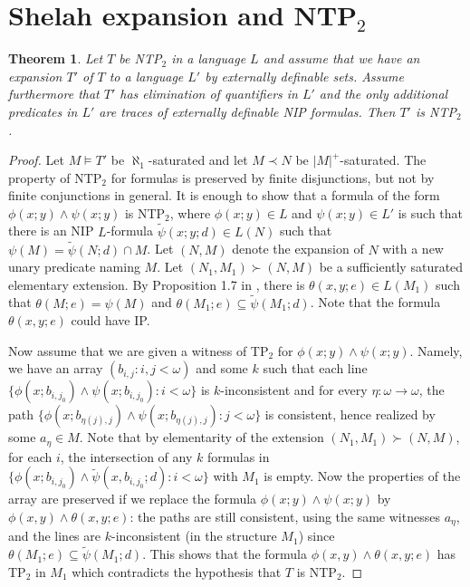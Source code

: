 \documentclass[12pt]{article}
\newtheorem{thm}{Theorem}[section]
\theoremstyle{definition}
\theoremstyle{mystyle}
\theoremstyle{remark}
\begin{document}
\appendix

\section{Shelah expansion and NTP$_2$}


\begin{thm}\label{th_shelahexp}
Let $T$ be NTP$_2$ in a language $L$ and assume that we have an expansion $T'$ of $T$ to a  language $L'$ by externally definable sets. Assume furthermore that $T'$ has elimination of quantifiers in $L'$ and the only additional predicates in $L'$ are traces of externally definable NIP formulas. Then $T'$ is NTP$_2$.
\end{thm}
\begin{proof}
Let $M\models T'$ be $\aleph_1$-saturated and let $M\prec N$ be $|M|^+$-saturated. The property of NTP$_2$ for formulas is preserved by finite disjunctions, but not by finite conjunctions in general. It is enough to show that a formula of the form $\phi(x;y)\wedge \psi(x;y)$ is NTP$_2$, where $\phi(x;y)\in L$ and $\psi(x;y) \in L'$ is such that there is an NIP $L$-formula $\tilde \psi(x;y;d)\in L(N)$ such that $\psi(M)=\tilde \psi(N;d)\cap M$. Let $(N,M)$ denote the expansion of $N$ with a new unary predicate naming $M$. Let $(N_1,M_1)\succ (N,M)$ be a sufficiently saturated elementary extension. By Proposition 1.7 in \cite{ChSi2}, there is $\theta(x,y;e)\in L(M_1)$ such that $\theta(M;e)=\psi(M)$ and $\theta(M_1;e)\subseteq \tilde \psi(M_1;d)$. Note that the formula $\theta(x,y;e)$ could have IP.

Now assume that we are given a witness of TP$_2$ for $\phi(x;y)\wedge \psi(x;y)$. Namely, we have an array $(b_{i,j}:i,j<\omega)$ and some $k$ such that each line $\{\phi(x;b_{i,j_0})\wedge \psi(x;b_{i,j_0}):i<\omega\}$ is $k$-inconsistent and for every $\eta:\omega \to \omega$, the path $\{\phi(x;b_{\eta(j),j})\wedge \psi(x;b_{\eta(j),j}):j<\omega\}$ is consistent, hence realized by some $a_\eta\in M$.
Note that by elementarity of the extension $(N_1,M_1)\succ (N,M)$, for each $i$, the intersection of any $k$ formulas in
 $\{\phi(x;b_{i,j_0})\wedge \tilde \psi(x,b_{i,j_0};d):i<\omega\}$ with $M_1$ is empty.
Now the properties of the array are preserved if we replace the formula $\phi(x;y)\wedge \psi(x;y)$ by $\phi(x,y)\wedge \theta(x,y;e)$: the paths are still consistent, using the same witnesses $a_\eta$, and the lines are $k$-inconsistent (in the structure $M_1$) since $\theta(M_1;e)\subseteq \tilde \psi(M_1;d)$. This shows that the formula $\phi(x,y)\wedge \theta(x,y;e)$ has TP$_2$ in $M_1$ which contradicts the hypothesis that $T$ is NTP$_2$.
\end{proof}

%

\end{document}
